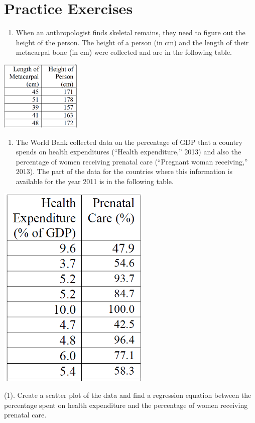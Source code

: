 \documentclass[
]{book}
\providecommand{\tightlist}{%
  \setlength{\itemsep}{0pt}\setlength{\parskip}{0pt}}
\begin{document}
\hfill\break

\hypertarget{practice-exercises-5}{%
\section{Practice Exercises}\label{practice-exercises-5}}

\begin{enumerate}
\def\labelenumi{\arabic{enumi}.}
\tightlist
\item
  When an anthropologist finds skeletal remains, they need to figure out the height of the person. The height of a person (in cm) and the length of their metacarpal bone (in cm) were collected and are in the following table.
\end{enumerate}

\begin{center}\includegraphics[width=0.2\linewidth]{week12/ex01} \end{center}

\begin{enumerate}
\def\labelenumi{\arabic{enumi}.}
\setcounter{enumi}{1}
\tightlist
\item
  The World Bank collected data on the percentage of GDP that a country spends on health expenditures (``Health expenditure,'' 2013) and also the percentage of women receiving prenatal care (``Pregnant woman receiving,'' 2013). The part of the data for the countries where this information is available for the year 2011 is in the following table.
\end{enumerate}

\begin{center}\includegraphics[width=0.2\linewidth]{week12/ex02} \end{center}

(1). Create a scatter plot of the data and find a regression equation between the percentage spent on health expenditure and the percentage of women receiving prenatal care.
\end{document}
